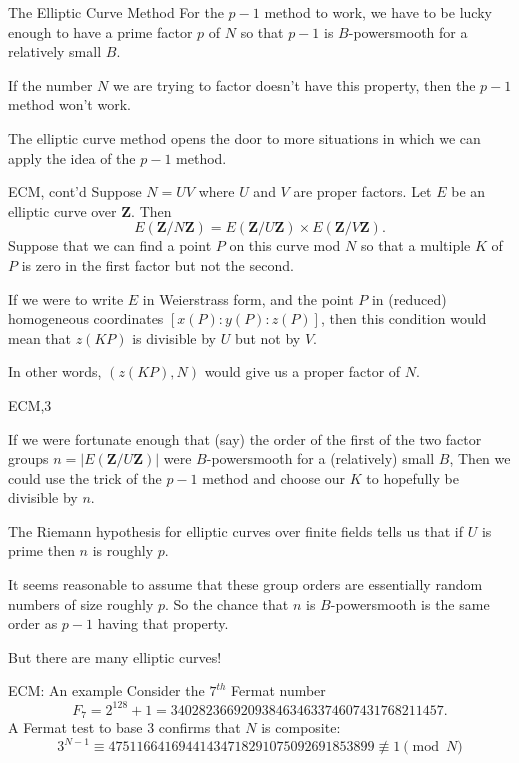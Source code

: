 \documentclass{beamer}
\begin{document}
\begin{frame}{The Elliptic Curve Method}
	For the $p-1$ method to work, we have to be lucky enough to have a prime factor $p$ of $N$ so that $p-1$ is $B$-powersmooth for a relatively small $B$.

        \bigskip\noindent
	If the number $N$ we are trying to factor doesn't have this property, then the $p-1$ method won't work.


        \bigskip\noindent
	The elliptic curve method opens the door to more situations in which we can apply the idea of the $p-1$ method.
\end{frame}
\begin{frame}{ECM, cont'd}
	Suppose $N=UV$ where $U$ and $V$ are proper factors.  Let $E$ be an elliptic curve over $\mathbf{Z}$.  Then 
	$$
	E(\mathbf{Z}/N\mathbf{Z})=E(\mathbf{Z}/U\mathbf{Z})\times E(\mathbf{Z}/V\mathbf{Z}).
	$$
	Suppose that we can find a point $P$ on this curve mod $N$ so that a multiple $K$ of $P$ is zero in the first factor but not the second.
	
	\bigskip\noindent
	If we were to write $E$ in Weierstrass form, and the point $P$ in (reduced) homogeneous coordinates $[x(P):y(P):z(P)]$, then this condition
	would mean that $z(KP)$ is divisible by $U$ but not by $V$.  
	
	\bigskip\noindent
	In other words, $(z(KP),N)$ would give us a proper factor of $N$.
\end{frame}
\begin{frame}{ECM,3}

	If we were fortunate enough that (say) the order of the  first of the two factor groups
	$n=|E(\mathbf{Z}/U\mathbf{Z})|$ were $B$-powersmooth for a (relatively) small $B$,
	Then we could use the trick of the $p-1$ method and choose our $K$ to hopefully be divisible by $n$.

        \bigskip\noindent
	The Riemann hypothesis for elliptic curves over finite fields tells us that if $U$ is prime then $n$ is roughly $p$.

        \bigskip\noindent
        It seems reasonable to assume that these group orders are essentially random numbers of size roughly $p$.
	So the chance that $n$ is $B$-powersmooth is the same order as $p-1$ having that property.

        \bigskip\noindent
	But there are many elliptic curves! 
\end{frame}
\begin{frame}{ECM: An example}
Consider the $7^{th}$ Fermat number 
$$
F_{7}=2^{128}+1=340282366920938463463374607431768211457.
$$
A Fermat test to base $3$ confirms that $N$ is composite:
$$
3^{N-1}\equiv 47511664169441434718291075092691853899\not\equiv 1\pmod{N}
$$
\end{frame}
\end{document}
